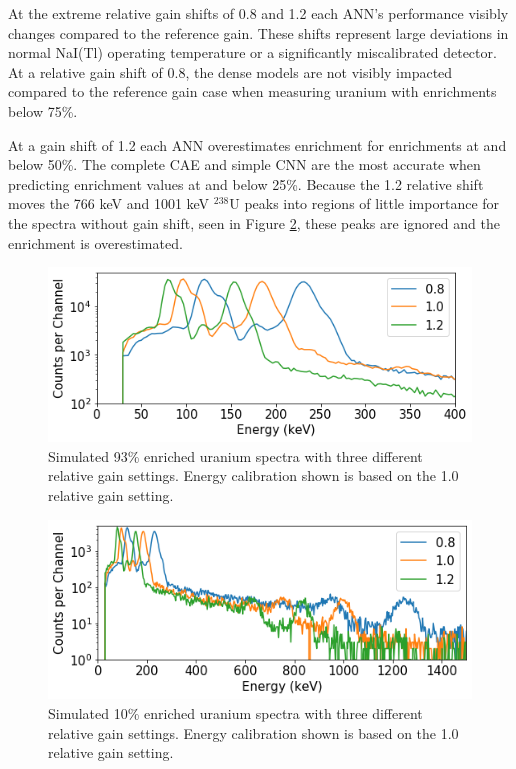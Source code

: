 At the extreme relative gain shifts of 0.8 and 1.2 each ANN's performance visibly changes compared to the reference gain. These shifts represent large deviations in normal NaI(Tl) operating temperature or a significantly miscalibrated detector. At a relative gain shift of 0.8, the dense models are not visibly impacted compared to the reference gain case when measuring uranium with enrichments below 75\%. 

At a gain shift of 1.2 each ANN overestimates enrichment for enrichments at and below 50\%. The complete CAE and simple CNN are the most accurate when predicting enrichment values at and below 25\%. Because the 1.2 relative shift moves the 766 keV and 1001 keV $^{238}$U peaks into regions of little importance for the spectra without gain shift, seen in Figure \ref{fig:simulated_uranium_calibration_10pct}, these peaks are ignored and the enrichment is overestimated.


\begin{figure}[H]
	\centering
	\includegraphics[width=0.8\linewidth]{images/simulated_uranium_calibration.png}
	\caption{Simulated 93\% enriched uranium spectra with three different relative gain settings. Energy calibration shown is based on the 1.0 relative gain setting.}
	\label{fig:simulated_uranium_calibration_93pct}
\end{figure}

\begin{figure}[H]
	\centering
	\includegraphics[width=0.8\linewidth]{images/simulated_uranium_calibration_1500kev.png}
	\caption{Simulated 10\% enriched uranium spectra with three different relative gain settings. Energy calibration shown is based on the 1.0 relative gain setting.}
	\label{fig:simulated_uranium_calibration_10pct}
\end{figure}


